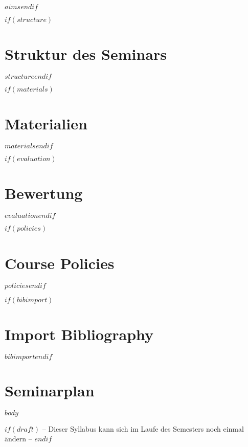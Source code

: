 \documentclass[11pt,a4paper]{article}
\begin{document}
$aims$$endif$

$if(structure)$\section*{Struktur des Seminars}

$structure$$endif$

$if(materials)$\section*{Materialien}

$materials$$endif$

$if(evaluation)$\section*{Bewertung}

$evaluation$$endif$

$if(policies)$\section*{Course Policies}

$policies$$endif$

$if(bibimport)$\section*{Import Bibliography}

$bibimport$$endif$


\section*{Seminarplan}

$body$

$if(draft)$
\centering
	-- Dieser Syllabus kann sich im Laufe des Semesters noch einmal ändern --
$endif$
\end{document}
